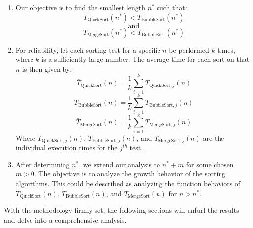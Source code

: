 \begin{enumerate}
\item Our objective is to find the smallest length \( n^* \) such that:
\[ T_{\text{QuickSort}}(n^*) < T_{\text{BubbleSort}}(n^*) \]
\[ \text{and} \]
\[ T_{\text{MergeSort}}(n^*) < T_{\text{BubbleSort}}(n^*) \]

\item For reliability, let each sorting test for a specific \( n \) be performed \( k \) times, where \( k \) is a sufficiently large number. The average time for each sort on that \( n \) is then given by:
\[ \bar{T}_{\text{QuickSort}}(n) = \frac{1}{k} \sum_{i=1}^{k} T_{\text{QuickSort},j}(n) \]
\[ \bar{T}_{\text{BubbleSort}}(n) = \frac{1}{k} \sum_{i=1}^{k} T_{\text{BubbleSort},j}(n) \]
\[ \bar{T}_{\text{MergeSort}}(n) = \frac{1}{k} \sum_{i=1}^{k} T_{\text{MergeSort},j}(n) \]
Where \( T_{\text{QuickSort},j}(n) \), \( T_{\text{BubbleSort},j}(n) \), and \( T_{\text{MergeSort},j}(n) \) are the individual execution times for the \( j^{th} \) test.

\item After determining \( n^* \), we extend our analysis to \( n^* + m \) for some chosen \( m > 0 \). The objective is to analyze the growth behavior of the sorting algorithms. This could be described as analyzing the function behaviors of \( \bar{T}_{\text{QuickSort}}(n) \), \( \bar{T}_{\text{BubbleSort}}(n) \), and \( \bar{T}_{\text{MergeSort}}(n) \) for \( n > n^* \).
\end{enumerate}

With the methodology firmly set, the following sections will unfurl the results and delve into a comprehensive analysis.
